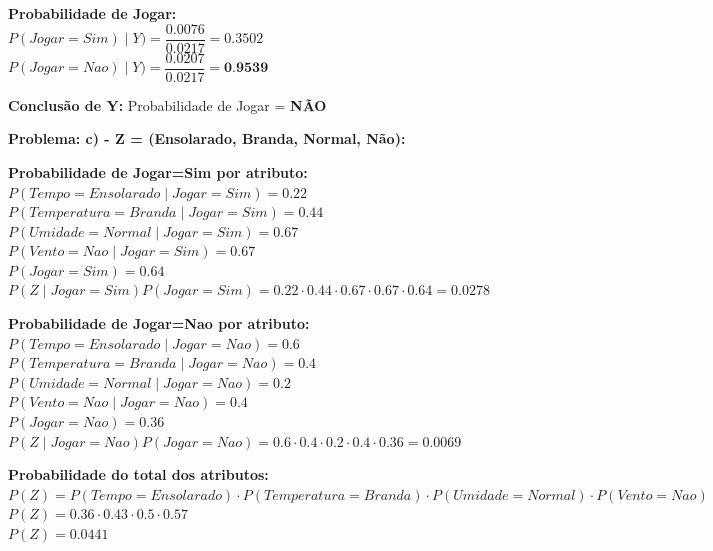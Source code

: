 \documentclass{article}
\begin{document}
  
  \begin{tabbing}
    \textbf{Probabilidade de Jogar:}\\
    $P(Jogar=Sim) \mid Y) = \dfrac{0.0076}{0.0217} = 0.3502$ \\
    $P(Jogar=Nao) \mid Y) = \dfrac{0.0207}{0.0217} = \textbf{0.9539}$
  \end{tabbing}

  \begin{tabbing}
    \textbf{Conclusão de Y:}
    Probabilidade de Jogar = \textbf{NÃO} \\
  \end{tabbing}

  \textbf{\large Problema: c) - Z = (Ensolarado, Branda, Normal, Não):}
  
  \begin{tabbing}
    \textbf{Probabilidade de Jogar=Sim por atributo:}\\
    $P(Tempo=Ensolarado \mid Jogar = Sim) =  0.22 $ \\
    $P(Temperatura=Branda \mid Jogar = Sim)  = 0.44 $ \\
    $P(Umidade=Normal \mid Jogar = Sim)  = 0.67 $ \\
    $P(Vento=Nao \mid Jogar = Sim) = 0.67 $ \\
    $P(Jogar=Sim) = 0.64$ \\
    $P(Z \mid Jogar=Sim)P(Jogar=Sim) = 0.22 \cdot 0.44 \cdot 0.67 \cdot 0.67 \cdot 0.64 = 0.0278$ \\
  \end{tabbing}

  \begin{tabbing}
    \textbf{Probabilidade de Jogar=Nao por atributo:}\\
    $P(Tempo=Ensolarado \mid Jogar = Nao) =  0.6 $ \\
    $P(Temperatura=Branda \mid Jogar = Nao)  = 0.4 $ \\
    $P(Umidade=Normal \mid Jogar = Nao)  = 0.2 $ \\
    $P(Vento=Nao \mid Jogar = Nao) = 0.4 $ \\
    $P(Jogar=Nao) = 0.36$ \\
    $P(Z \mid Jogar=Nao)P(Jogar=Nao) = 0.6 \cdot 0.4 \cdot 0.2 \cdot 0.4 \cdot 0.36 = 0.0069$ \\
  \end{tabbing}

  \begin{tabbing}
    \textbf{Probabilidade do total dos atributos:}\\
    $P(Z) = P(Tempo=Ensolarado) \cdot P(Temperatura=Branda) \cdot P(Umidade=Normal) \cdot P(Vento=Nao)$ \\
    $P(Z) = 0.36 \cdot 0.43 \cdot 0.5 \cdot 0.57$ \\
    $P(Z) = 0.0441$  
  \end{tabbing}
  
\end{document}
